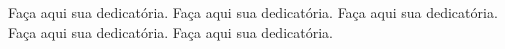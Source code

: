 \begin{dedicatoria}
 \vspace*{\fill}
 \noindent
  \raggedleft
 \begin{minipage}{.54\textwidth}
   Faça aqui sua dedicatória. Faça aqui sua dedicatória. Faça aqui sua dedicatória. Faça aqui sua dedicatória. Faça aqui sua dedicatória.
   \end{minipage}
\end{dedicatoria}
